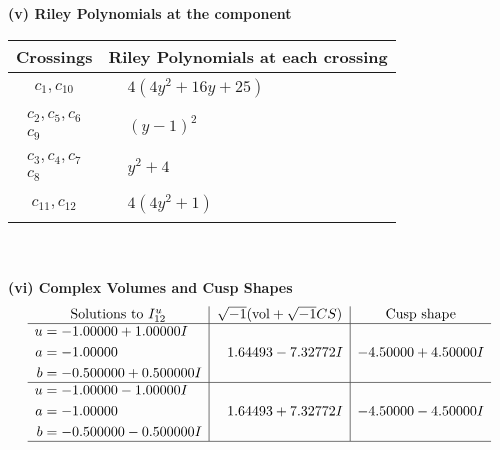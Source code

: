 \documentclass[1p]{elsarticle_modified}
\theoremstyle{definition}
\newcommand{\I}{\sqrt{-1}}
\begin{document}
\newpage\renewcommand{\arraystretch}{1}
\flushleft \textbf{(v) Riley Polynomials at the component}\newline \\
\begin{tabular}{m{50pt}|m{274pt}}
Crossings & \hspace{64pt}Riley Polynomials at each crossing \\
\hline $$\begin{aligned}c_{1},c_{10}\end{aligned}$$&$\begin{aligned}
&4(4 y^2+16 y+25)
\end{aligned}$\\
\hline $$\begin{aligned}c_{2},c_{5},c_{6}\\c_{9}\end{aligned}$$&$\begin{aligned}
&(y-1)^2
\end{aligned}$\\
\hline $$\begin{aligned}c_{3},c_{4},c_{7}\\c_{8}\end{aligned}$$&$\begin{aligned}
&y^2+4
\end{aligned}$\\
\hline $$\begin{aligned}c_{11},c_{12}\end{aligned}$$&$\begin{aligned}
&4(4 y^2+1)
\end{aligned}$\\
\hline
\end{tabular}\\~\\
\newpage\flushleft \textbf{(vi) Complex Volumes and Cusp Shapes}
$$\begin{array}{c|c|c}  
\text{Solutions to }I^u_{12}& \I (\text{vol} + \sqrt{-1}CS) & \text{Cusp shape}\\
 \hline 
\begin{aligned}
u &= -1.00000 + 1.00000 I \\
a &= -1.00000\phantom{ +0.000000I} \\
b &= -0.500000 + 0.500000 I\end{aligned}
 & \phantom{-}1.64493 - 7.32772 I & -4.50000 + 4.50000 I \\ \hline\begin{aligned}
u &= -1.00000 - 1.00000 I \\
a &= -1.00000\phantom{ +0.000000I} \\
b &= -0.500000 - 0.500000 I\end{aligned}
 & \phantom{-}1.64493 + 7.32772 I & -4.50000 - 4.50000 I\\
 \hline 
 \end{array}$$\newpage\newpage\renewcommand{\arraystretch}{1}
\end{document}
